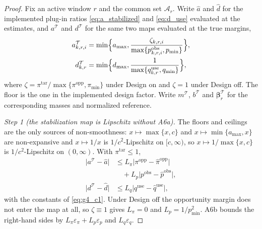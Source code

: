 \begin{proof}



Fix an active window $r$ and the common set $\mathcal{A}_r$.  Write
$\widehat a$ and $\widehat d$ for the implemented plug-in ratios
\eqref{eq:a_stabilized} and \eqref{eq:d_use} evaluated at the estimates, and
$a^{\mathcal T}$ and $d^{\mathcal T}$ for the same two maps evaluated at the
true margins,
\[
\begin{aligned}
a^{\mathcal T}_{k,r,i}
&=
\min\Bigl\{a_{\max},
\frac{\zeta_{k,r,i}}{\max\{p^{\mathrm{obs}}_{k,r,i},p_{\min}\}}\Bigr\},\\
d^{\mathcal T}_{k,r}
&=
\min\Bigl\{d_{\max},
\frac{1}{\max\{q^{\mathrm{use}}_{k,r},q_{\min}\}}\Bigr\},
\end{aligned}
\]
where $\zeta=\pi^{\mathrm{tar}}/\max\{\pi^{\mathrm{opp}},\pi_{\min}\}$ under Design on and
$\zeta=1$ under Design off.
The floor is the one in the implemented design factor.
Write $m^{\mathcal T}$, $b^{\mathcal T}$ and
$\boldsymbol\beta_r^{\mathcal T}$ for the corresponding masses and normalized
reference.

\emph{Step 1 (the stabilization map is Lipschitz without A6a).}  The floors
and ceilings are the only sources of non-smoothness: $x\mapsto\max\{x,c\}$ and
$x\mapsto\min\{a_{\max},x\}$ are non-expansive and $x\mapsto1/x$ is
$1/c^2$-Lipschitz on $[c,\infty)$, so $x\mapsto1/\max\{x,c\}$ is
$1/c^2$-Lipschitz on $(0,\infty)$.  With $\pi^{\mathrm{tar}}\le1$,
\begin{equation}
\begin{aligned}
 \bigl\lvert a^{\mathcal T}-\widehat a\bigr\rvert
 &\le
 L_\pi\bigl\lvert\pi^{\mathrm{opp}}-\widehat\pi^{\mathrm{opp}}\bigr\rvert\\
 &\quad
 +L_p\bigl\lvert p^{\mathrm{obs}}-\widehat p^{\mathrm{obs}}\bigr\rvert,\\
 \bigl\lvert d^{\mathcal T}-\widehat d\bigr\rvert
 &\le
 L_q\bigl\lvert q^{\mathrm{use}}-\widehat q^{\mathrm{use}}\bigr\rvert,
\end{aligned}
 \label{eq:app_plugin_lipschitz}
\end{equation}
with the constants of \eqref{eq:g4_c1}.  Under Design off the opportunity
margin does not enter the map at all, so $\zeta\equiv1$ gives $L_\pi=0$ and
$L_p=1/p_{\min}^2$.  A6b bounds the right-hand sides by
$L_\pi\varepsilon_\pi+L_p\varepsilon_p$ and $L_q\varepsilon_q$.


\end{proof}
